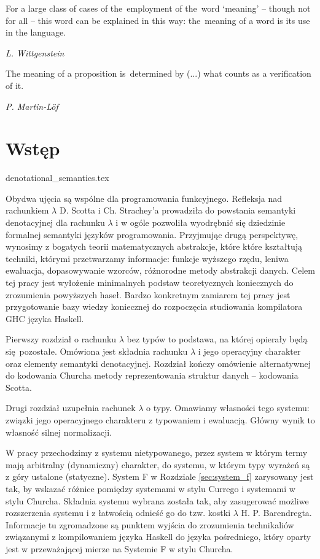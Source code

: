 \epigraph{
For a large class of cases of the~employment of the~word ‘meaning’ -- though not for all -- this word can be explained in this way: the~meaning of a word is its use in the language. \cite{Wittgenstein53}
}{\emph{\small{L. Wittgenstein}}}

\epigraph{The meaning of a proposition is~determined by (...) what counts as a
verification of it. \cite{Lof_96}}{\emph{\small{{P. Martin-Löf}}}}


\section*{Wstęp}
{denotational_semantics.tex}

Obydwa ujęcia są wspólne dla programowania funkcyjnego. Refleksja nad rachunkiem \(\lambda\) D. Scotta i Ch. Strachey'a prowadziła do powstania semantyki denotacyjnej dla rachunku \(\lambda\) i w ogóle pozwoliła wyodrębnić się dziedzinie formalnej semantyki języków programowania. Przyjmując drugą perspektywę, wynosimy z bogatych teorii matematycznych abstrakcje, które które kształtują techniki, którymi przetwarzamy informacje: funkcje wyższego rzędu, leniwa ewaluacja, dopasowywanie wzorców, różnorodne metody abstrakcji danych. 
Celem tej pracy jest wyłożenie minimalnych podstaw teoretycznych koniecznych do zrozumienia powyższych haseł. Bardzo konkretnym zamiarem tej pracy jest przygotowanie bazy wiedzy koniecznej do rozpoczęcia studiowania kompilatora GHC języka Haskell.

Pierwszy rozdział o rachunku \(\lambda\) bez typów to podstawa, na której opierały będą się pozostałe. Omówiona jest składnia rachunku \(\lambda\) i jego operacyjny charakter oraz elementy semantyki denotacyjnej. Rozdział kończy omówienie alternatywnej do kodowania Churcha metody reprezentowania struktur danych -- kodowania Scotta.

Drugi rozdział uzupełnia rachunek \(\lambda\) o typy. Omawiamy własności tego systemu: związki jego operacyjnego charakteru z typowaniem i ewaluacją. Główny wynik to własność silnej normalizacji.

W pracy przechodzimy z systemu nietypowanego, przez system w którym termy mają arbitralny (dynamiczny) charakter, do systemu, w którym typy wyrażeń są z góry ustalone (statyczne). System F w Rozdziale \ref{sec:system_f} zarysowany jest tak, by wskazać różnice pomiędzy systemami w stylu Currego i systemami w stylu Churcha. Składnia systemu wybrana została tak, aby zasugerować możliwe rozszerzenia systemu i z łatwością odnieść go do tzw. kostki \(\lambda\) H. P. Barendregta. Informacje tu zgromadzone są punktem wyjścia do zrozumienia technikaliów związanymi z kompilowaniem języka Haskell do języka pośredniego, który oparty jest w przeważającej mierze na Systemie F w stylu Churcha. 
